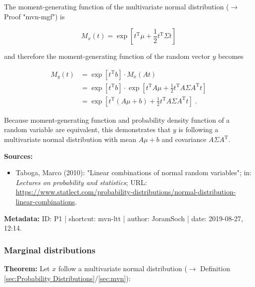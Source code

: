 \documentclass[a4paper,12pt]{book}
\begin{document}
The moment-generating function of the multivariate normal distribution ($\rightarrow$ Proof "mvn-mgf") is

\begin{equation} \label{eq:mvn-ltt-mvn-mgf}
M_x(t) = \exp \left[ t^\mathrm{T} \mu + \frac{1}{2} t^\mathrm{T} \Sigma t \right]
\end{equation}

and therefore the moment-generating function of the random vector $y$ becomes

\begin{equation} \label{eq:mvn-ltt-y-mgf-s2}
\begin{split}
M_y(t) &= \exp \left[ t^\mathrm{T} b \right] \cdot M_x(At) \\
&= \exp \left[ t^\mathrm{T} b \right] \cdot \exp \left[ t^\mathrm{T} A \mu + \frac{1}{2} t^\mathrm{T} A \Sigma A^\mathrm{T} t \right] \\
&= \exp \left[ t^\mathrm{T} \left( A \mu + b \right) + \frac{1}{2} t^\mathrm{T} A \Sigma A^\mathrm{T} t \right] \; .
\end{split}
\end{equation}

Because moment-generating function and probability density function of a random variable are equivalent, this demonstrates that $y$ is following a multivariate normal distribution with mean $A \mu + b$ and covariance $A \Sigma A^\mathrm{T}$.

\vspace{1em}
\textbf{Sources:}
\begin{itemize}
\item Taboga, Marco (2010): "Linear combinations of normal random variables"; in: \textit{Lectures on probability and statistics}; URL: \url{https://www.statlect.com/probability-distributions/normal-distribution-linear-combinations}.
\end{itemize}


\vspace{1em}
\textbf{Metadata:} ID: P1 | shortcut: mvn-ltt | author: JoramSoch | date: 2019-08-27, 12:14.


\subsubsection[\textbf{Marginal distributions}]{Marginal distributions} \label{sec:mvn-marg}

\vspace{1em}
\textbf{Theorem:} Let $x$ follow a multivariate normal distribution ($\rightarrow$ Definition \ref{sec:Probability Distributions}/\ref{sec:mvn}):
\end{document}
